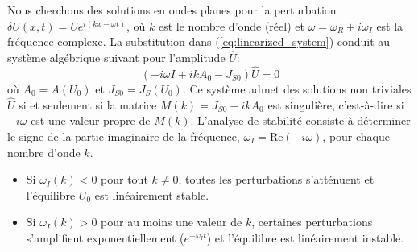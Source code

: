 Nous cherchons des solutions en ondes planes pour la perturbation \( \delta U(x, t) = \hat{U} e^{i(kx - \omega t)} \), où \( k \) est le nombre d'onde (réel) et \( \omega = \omega_R + i \omega_I \) est la fréquence complexe. La substitution dans (\ref{eq:linearized_system}) conduit au système algébrique suivant pour l'amplitude \( \hat{U} \):
\begin{equation}
    \label{eq:eigenvalue_problem_lsa}
    (-i\omega I + ik A_0 - J_{S0}) \hat{U} = 0
\end{equation}
où \( A_0 = A(U_0) \) et \( J_{S0} = J_S(U_0) \). Ce système admet des solutions non triviales \( \hat{U} \) si et seulement si la matrice \( M(k) = J_{S0} - ik A_0 \) est singulière, c'est-à-dire si \( -i\omega \) est une valeur propre de \( M(k) \). L'analyse de stabilité consiste à déterminer le signe de la partie imaginaire de la fréquence, \( \omega_I = \text{Re}(-i\omega) \), pour chaque nombre d'onde \( k \).
\begin{itemize}
    \item Si \( \omega_I(k) < 0 \) pour tout \( k \neq 0 \), toutes les perturbations s'atténuent et l'équilibre \( U_0 \) est linéairement stable.
    \item Si \( \omega_I(k) > 0 \) pour au moins une valeur de \( k \), certaines perturbations s'amplifient exponentiellement (\( e^{-\omega_I t} \)) et l'équilibre est linéairement instable.
\end{itemize}

